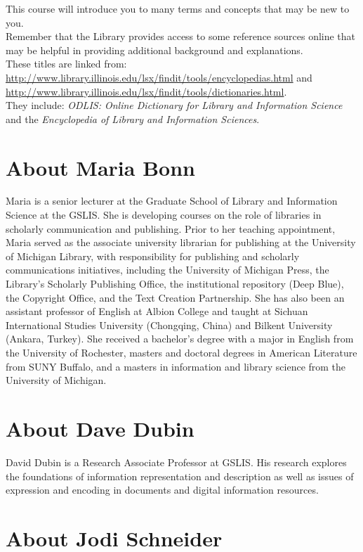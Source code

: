 \documentclass[]{article}
\begin{document}
This course will introduce you to many terms and concepts that may be
new to you.\\
Remember that the Library provides access to some reference sources
online that may be helpful in providing additional background and
explanations.\\
These titles are linked from:
\url{http://www.library.illinois.edu/lsx/findit/tools/encyclopedias.html}
and
\url{http://www.library.illinois.edu/lsx/findit/tools/dictionaries.html}.\\
They include: \emph{ODLIS: Online Dictionary for Library and Information
Science} and the \emph{Encyclopedia of Library and Information
Sciences}.

\section{About Maria Bonn}\label{about-maria-bonn}

Maria is a senior lecturer at the Graduate School of Library and
Information Science at the GSLIS. She is developing courses on the role
of libraries in scholarly communication and publishing. Prior to her
teaching appointment, Maria served as the associate university librarian
for publishing at the University of Michigan Library, with
responsibility for publishing and scholarly communications initiatives,
including the University of Michigan Press, the Library's Scholarly
Publishing Office, the institutional repository (Deep Blue), the
Copyright Office, and the Text Creation Partnership. She has also been
an assistant professor of English at Albion College and taught at
Sichuan International Studies University (Chongqing, China) and Bilkent
University (Ankara, Turkey). She received a bachelor's degree with a
major in English from the University of Rochester, masters and doctoral
degrees in American Literature from SUNY Buffalo, and a masters in
information and library science from the University of Michigan.

\section{About Dave Dubin}\label{about-dave-dubin}

David Dubin is a Research Associate Professor at GSLIS. His research
explores the foundations of information representation and description
as well as issues of expression and encoding in documents and digital
information resources.

\section{About Jodi Schneider}\label{about-jodi-schneider}
\end{document}
